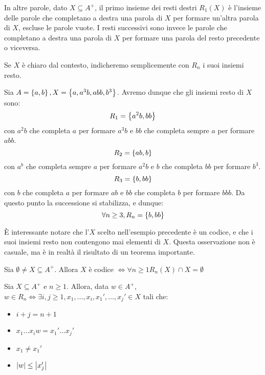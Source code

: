 In altre parole, dato \(X \subseteq A^+\), il primo insieme dei resti destri \(R_1(X)\) è l'insieme delle parole che completano a destra una parola di \(X\) per formare un'altra parola di \(X\), escluse le parole vuote.
I resti successivi sono invece le parole che completano a destra una parola di \(X\) per formare una parola del resto precedente o viceversa.

\begin{note}
  Se \(X\) è chiaro dal contesto, indicheremo semplicemente con \(R_n\) i suoi insiemi resto.
\end{note}
\begin{example}
  Sia \(A = \set{a,b}, X = \set{a,a^3b,abb,b^3}\).
  Avremo dunque che gli insiemi resto di \(X\) sono:
  \[R_1 = \set{a^2b, bb}\]
  con \(a^2b\) che completa \(a\) per formare \(a^3b\) e \(bb\) che completa sempre \(a\) per formare \(abb\).
  \[R_2 = \set{ab,b}\]
  con \(a^b\) che completa sempre \(a\) per formare \(a^2b\) e \(b\) che completa \(bb\) per formare \(b^3\).
  \[R_3 = \set{b,bb}\]
  con \(b\) che completa \(a\) per formare \(ab\) e \(bb\) che completa \(b\) per formare \(bbb\).
  Da questo punto la successione si stabilizza, e dunque:
  \[\forall n \geq 3, R_n = \set{b,bb}\]
\end{example}

È interessante notare che l'\(X\) scelto nell'esempio precedente è un codice, e che i suoi insiemi resto non contengono mai elementi di \(X\).
Questa osservazione non è casuale, ma è in realtà il risultato di un teorema importante.
\begin{theorem}
  Sia \(\emptyset \neq X \subseteq A^+\). Allora \(X\) è codice \(\iff \forall n\geq 1 R_n(X) \cap X = \emptyset\)
\end{theorem}


\begin{lemma}
  Sia \(X \subseteq A^+\) e \(n\geq 1\). Allora, data \(w \in A^+\), \(w \in R_n \iff \exists i,j\geq 1, x_1,\ldots,x_i,x_1',\ldots,x_j' \in X\) tali che:
  \begin{itemize}
    \item \(i+j=n+1\)
    \item \(x_1\ldots x_{i}w = x_1'\ldots x_j'\)
    \item \(x_1 \neq x_1'\)
    \item \(\left|w\right| \leq \left|x_j'\right|\)
  \end{itemize}
\end{lemma}

